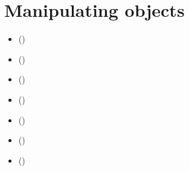 \documentclass[a4paper,12pt,english]{sphinxhowto}
\begin{document}
\section{Manipulating  objects}
\label{\detokenize{tutorial:manipulating-digraph-objects}}\label{\detokenize{tutorial:digraph-tools-label}}
\begin{sphinxShadowBox}
\begin{itemize}
\item {} 
\label{\detokenize{tutorial:id236}}{\hyperref[\detokenize{tutorial:random-digraphs}]{}} ()

\item {} 
\label{\detokenize{tutorial:id237}}{\hyperref[\detokenize{tutorial:graphviz-drawings}]{}} ()

\item {} 
\label{\detokenize{tutorial:id238}}{\hyperref[\detokenize{tutorial:asymmetric-and-symmetric-parts}]{}} ()

\item {} 
\label{\detokenize{tutorial:id239}}{\hyperref[\detokenize{tutorial:border-and-inner-parts}]{}} ()

\item {} 
\label{\detokenize{tutorial:id240}}{\hyperref[\detokenize{tutorial:fusion-by-epistemic-disjunction}]{}} ()

\item {} 
\label{\detokenize{tutorial:id241}}{\hyperref[\detokenize{tutorial:dual-converse-and-codual-digraphs}]{}} ()

\item {} 
\label{\detokenize{tutorial:id242}}{\hyperref[\detokenize{tutorial:symmetric-and-transitive-closures}]{}} ()


\end{itemize}
\end{sphinxShadowBox}
\end{document}
